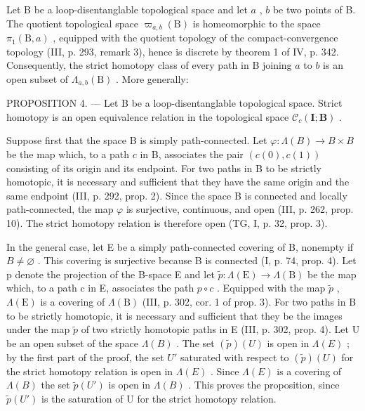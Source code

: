 Let B be a loop-disentanglable topological space and let \(a\) , \(b\) be two points of B. The quotient topological space \(\varpi_{a,b}(\mathrm{B})\) is homeomorphic to the space \(\pi_1(\mathrm{B},a)\) , equipped with the quotient topology of the compact-convergence topology (III, p. 293, remark 3), hence is discrete by theorem 1 of IV, p. 342. Consequently, the strict homotopy class of every path in B joining \(a\) to \(b\) is an open subset of \(\Lambda_{a,b}(\mathrm{B})\) . More generally:

PROPOSITION 4. --- Let B be a loop-disentanglable topological space. Strict homotopy is an open equivalence relation in the topological space \(\mathcal{C}_{c}(\mathbf{I};\mathbf{B})\) .

Suppose first that the space B is simply path-connected. Let \(\varphi\colon\Lambda(B)\to B\times B\) be the map which, to a path \(c\) in B, associates the pair \((c(0),c(1))\) consisting of its origin and its endpoint. For two paths in B to be strictly homotopic, it is necessary and sufficient that they have the same origin and the same endpoint (III, p. 292, prop. 2). Since the space B is connected and locally path-connected, the map \(\varphi\) is surjective, continuous, and open (III, p. 262, prop. 10). The strict homotopy relation is therefore open (TG, I, p. 32, prop. 3).

In the general case, let E be a simply path-connected covering of B, nonempty if \(B \neq \varnothing\) . This covering is surjective because B is connected (I, p. 74, prop. 4). Let p denote the projection of the B-space E and let \(\widetilde{p} \colon \Lambda(\mathrm{E}) \to \Lambda(\mathrm{B})\) be the map which, to a path c in E, associates the path \(p \circ c\) . Equipped with the map \(\widetilde{p}\) , \(\Lambda(\mathrm{E})\) is a covering of \(\Lambda(\mathrm{B})\) (III, p. 302, cor. 1 of prop. 3). For two paths in B to be strictly homotopic, it is necessary and sufficient that they be the images under the map \(\widetilde{p}\) of two strictly homotopic paths in E (III, p. 302, prop. 4). Let U be an open subset of the space \(\Lambda(B)\) . The set \((\widetilde{p})(U)\) is open in \(\Lambda(E)\) ; by the first part of the proof, the set \(U'\) saturated with respect to \((\widetilde{p})(U)\) for the strict homotopy relation is open in \(\Lambda(E)\) . Since \(\Lambda(E)\) is a covering of \(\Lambda(B)\) the set \(\widetilde{p}(U')\) is open in \(\Lambda(B)\) . This proves the proposition, since \(\widetilde{p}(U')\) is the saturation of U for the strict homotopy relation.

